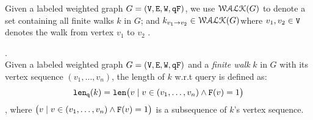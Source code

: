 %
Given a labeled weighted graph $G = (\mathtt{V}, \mathtt{E}, \mathtt{W}, \mathtt{qF})$, 
we use $\mathcal{WALK}(G)$ to denote a set containing all finite walks $k$ in $G$;
and $k_{v_1 \to v_2} \in \mathcal{WALK}(G)$where $v_1, v_2 \in \mathtt{V}$ denotes the walk from vertex $v_1$ to $v_2$ .
%
%
\begin{defn}.
\label{def:qlen}
\\
Given a labeled weighted graph $G = (\mathtt{V}, \mathtt{E}, \mathtt{W}, \mathtt{qF})$ and a \emph{finite walk} $k$ in $G$ with its vertex sequence $(v_1, \ldots, v_{n})$, the length of $k$ w.r.t query is defined as:
\[
  \mathtt{len}_{\tt q}(k) = \mathtt{len}\big(
  v \mid v \in (v_1, \ldots, v_{n}) \land \mathtt{F}(v) = 1 \big)
\]
, where $\big(v \mid v \in (v_1, \ldots, v_{n}) \land \mathtt{F}(v) = 1 \big)$ is a subsequence of $k$'s vertex sequence.
\end{defn}
%
